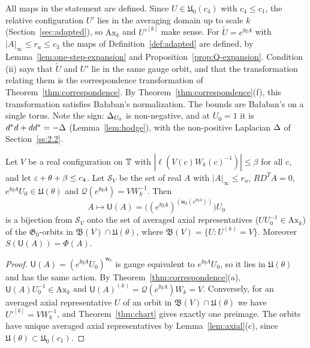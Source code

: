 All maps in the statement are defined. Since $U\in\mathfrak U_0(c_4)$ with $c_4\le c_1$, the relative configuration $U'$ lies in the averaging domain up to scale $k$ (Section~\ref{sec:adapted}), so $\mathrm{Ax}_k$ and $U'^{[k]}$ make sense. For $\tilde U=e^{\ii\eta A}$ with $|A|_\infty\le r_u\le c_3$ the maps of Definition~\ref{def:adapted} are defined, by Lemma~\ref{lem:one-step-expansion} and Proposition~\ref{prop:Q-expansion}. Condition (ii) says that $\tilde U$ and $U'$ lie in the same gauge orbit, and that the transformation relating them is the correspondence transformation of Theorem~\ref{thm:correspondence}. By Theorem~\ref{thm:correspondence}(f), this transformation satisfies Ba\l aban's normalization. The bounds are Ba\l aban's \cite[(1.36)--(1.39)]{BalReg} on a single torus. Note the sign: $\Delta_{U_0}$ is non-negative, and at $U_0=1$ it is $d^*d+dd^*=-\Delta$ (Lemma~\ref{lem:hodge}), with the non-positive Laplacian $\Delta$ of Section~\ref{ss:2.2}.

\begin{corollary}\label{cor:parametrization}
Let $V$ be a real configuration on $\mathbb T$ with $|\ell(V(c)W_k(c)^{-1})|\le\beta$ for all $c$, and let $\varepsilon+\theta+\beta\le c_4$. Let $\mathcal S_V$ be the set of real $A$ with $|A|_\infty\le r_u$, $R D^TA=0$, $e^{\ii\eta A}U_0\in\mathfrak U(\theta)$ and $\mathcal Q(e^{\ii\eta A})=VW_k^{-1}$. Then
\[
A\longmapsto\mathsf U(A)=\big((e^{\ii\eta A})^{(\mathsf w_k(e^{\ii\eta A}))}\big)U_0
\]
is a bijection from $\mathcal S_V$ onto the set of averaged axial representatives ($UU_0^{-1}\in\mathrm{Ax}_k$) of the $\mathfrak G_0$-orbits in $\mathfrak B(V)\cap\mathfrak U(\theta)$, where $\mathfrak B(V)=\{U:U^{(k)}=V\}$. Moreover $S(\mathsf U(A))=\Phi(A)$.
\end{corollary}

\begin{proof}
$\mathsf U(A)=(e^{\ii\eta A}U_0)^{\mathsf w_k}$ is gauge equivalent to $e^{\ii\eta A}U_0$, so it lies in $\mathfrak U(\theta)$ and has the same action. By Theorem~\ref{thm:correspondence}(a), $\mathsf U(A)U_0^{-1}\in\mathrm{Ax}_k$ and $\mathsf U(A)^{(k)}=\mathcal Q(e^{\ii\eta A})W_k=V$. Conversely, for an averaged axial representative $U$ of an orbit in $\mathfrak B(V)\cap\mathfrak U(\theta)$ we have $U'^{[k]}=VW_k^{-1}$, and Theorem~\ref{thm:chart} gives exactly one preimage. The orbits have unique averaged axial representatives by Lemma~\ref{lem:axial}(c), since $\mathfrak U(\theta)\subset\mathfrak U_0(c_1)$.
\end{proof}

